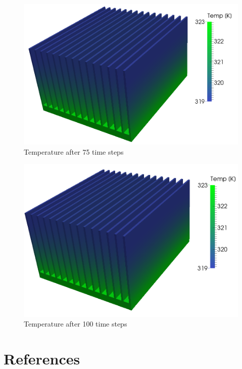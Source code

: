 \documentclass[12pt]{article}
\begin{document}
	\begin{figure}[H]
    \includegraphics[scale=0.3]{sink-MPI/heatSink_mpi_ts75.png}
    \centering
    \caption{Temperature after 75 time steps}
	\end{figure}	
	\begin{figure}[H]
    \includegraphics[scale=0.3]{sink-MPI/heatSink_mpi_ts99.png}
    \centering
    \caption{Temperature after 100 time steps}
	\end{figure}	

	\section{References}
	
	
	
	
	
	
\end{document}
